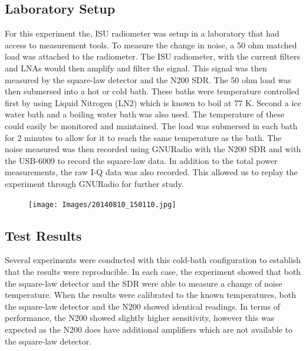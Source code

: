 \subsection{Laboratory Setup}
For this experiment the, ISU radiometer was setup in a laboratory that had access to measurement tools.  To measure the change in noise, a 50 ohm matched load was attached to the radiometer.  The ISU radiometer, with the current filters and LNAs would then amplify and filter the signal.  This signal was then measured by the square-law detector and the N200 SDR.  The 50 ohm load was then submersed into a hot or cold bath.  These baths were temperature controlled first by using Liquid Nitrogen (LN2) which is known to boil at 77 K.  Second a ice water bath and a boiling water bath was also used.  The temperature of these could easily be monitored and maintained.  The load was submersed in each bath for 2 minutes to allow for it to reach the same temperature as the bath.  The noise measured was then recorded using GNURadio with the N200 SDR and with the USB-6009 to record the square-law data.  In addition to the total power measurements, the raw I-Q data was also recorded.  This allowed us to replay the experiment through GNURadio for further study.

\begin{figure}[h!tb] \centering

\texttt{[image: Images/20140810\_150110.jpg]}

\label{LabSetup}
\end{figure}

\subsection{Test Results}

Several experiments were conducted with this cold-bath configuration to establish that the results were reproducible.  In each case, the experiment showed that both the square-law detector and the SDR were able to measure a change of noise temperature.  When the results were calibrated to the known temperatures, both the square-law detector and the N200 showed identical readings.  In terms of performance, the N200 showed slightly higher sensitivity, however this was expected as the N200 does have additional amplifiers which are not available to the square-law detector.  

